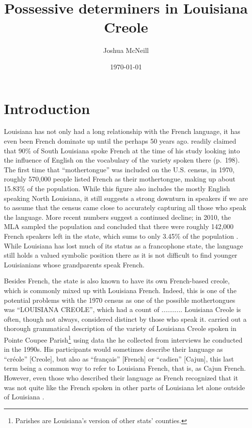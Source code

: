 \documentclass{article}
\title{Possessive determiners in Louisiana Creole}
\author{Joshua McNeill}
\date{\today}
\begin{document}
  \maketitle
  \onehalfspacing
  \section{Introduction}
    Louisiana has not only had a long relationship with the French language, it has even been French dominate up until the perhaps 50 years ago.
    \textcite{smith_influence_1939} readily claimed that 90\% of South Louisiana spoke French at the time of his study looking into the influence of English on the vocabulary of the variety spoken there (p.~198).
    The first time that ``mothertongue'' was included on the U.S. census, in 1970, roughly 570,000 people listed French as their mothertongue, making up about 15.83\% of the population.
    While this figure also includes the mostly English speaking North Louisiana, it still suggests a strong downturn in speakers if we are to assume that the census came close to accurately capturing all those who speak the language.
    More recent numbers suggest a continued decline; in 2010, the MLA sampled the population and concluded that there were roughly 142,000 French speakers left in the state, which sums to only 3.45\% of the population \parencite{mla_louisiana_nodate}.
    While Louisiana has lost much of its status as a francophone state, the language still holds a valued symbolic position there as it is not difficult to find younger Louisianians whose grandparents speak French.

    Besides French, the state is also known to have its own French-based creole, which is commonly mixed up with Louisiana French.
    Indeed, this is one of the potential problems with the 1970 census as one of the possible mothertongues was ``LOUISIANA CREOLE'', which had a count of ...........
    Louisiana Creole is often, though not always, considered distinct by those who speak it.
    \textcite{klingler_if_2003} carried out a thorough grammatical description of the variety of Louisiana Creole spoken in Pointe Coupee Parish\footnote{Parishes are Louisiana's version of other stats' counties.} using data the he collected from interviews he conducted in the 1990s.
    His participants would sometimes describe their language as ``créole'' [Creole], but also as ``français'' [French] or ``cadien'' [Cajun], this last term being a common way to refer to Louisiana French, that is, as Cajun French.
    However, even those who described their language as French recognized that it was not quite like the French spoken in other parts of Louisiana let alone outside of Louisiana \parencite[p.~128]{klingler_if_2003}.
\end{document}
